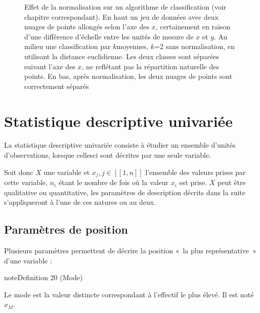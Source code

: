 \documentclass[letterpaper,10pt,french]{sphinxmanual}
\begin{document}
\begin{figure}[htbp]
\centering
\capstart

\noindent{}
\caption{Effet de la normalisation sur un algorithme de classification (voir chapitre correspondant). En haut un jeu de données avec deux nuages de points allongés selon l’axe des \(x\), certainement en raison d’une différence d’échelle entre les unités de mesure de \(x\) et \(y\). Au milieu une classification par \(k\)\sphinxhyphen{}moyennes, \(k\)=2 sans normalisation, en utilisant la distance euclidienne. Les deux classes sont séparées suivant l’axe des \(x\), ne reflétant pas la répartition naturelle des points. En bas, après normalisation, les deux nuages de points sont correctement séparés}\label{\detokenize{statsdescriptives:biais}}\end{figure}


\section{Statistique descriptive univariée}
\label{\detokenize{statsdescriptives:statistique-descriptive-univariee}}
\ignorespaces 
\sphinxAtStartPar
La statistique descriptive univariée consiste à étudier un ensemble d’unités d’observations, lorsque celles\sphinxhyphen{}ci sont décrites par une seule variable.

\sphinxAtStartPar
Soit donc \(X\) une variable et \(x_j,j\in [\![1,n]\!]\) l’ensemble des valeurs prises par cette variable, \(n_i\) étant le nombre de fois où la valeur \(x_i\) est prise. \(X\) peut être qualitative ou quantitative, les paramètres de description décrits dans la suite s’appliqueront à l’une de ces natures ou au deux.


\subsection{Paramètres de position}
\label{\detokenize{statsdescriptives:parametres-de-position}}
\sphinxAtStartPar
Plusieurs paramètres permettent de décrire la position « la plus représentative » d’une variable :
\label{statsdescriptives:definition-4}
\begin{sphinxadmonition}{note}{Definition 20 (Mode)}



\sphinxAtStartPar
Le mode est la valeur distincte correspondant à l’effectif le plus élevé. Il est noté \(x_M\).
\end{sphinxadmonition}
\end{document}
